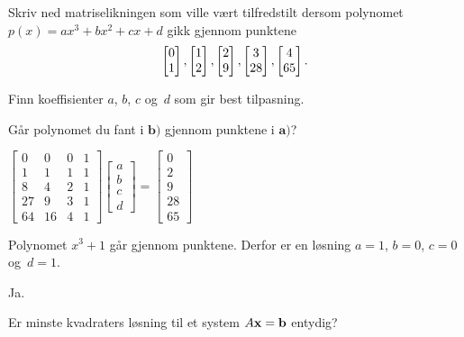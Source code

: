 \begin{oppgave}

\begin{punkt}
Skriv ned matriselikningen som ville vært tilfredstilt dersom polynomet $p(x)=ax^3+bx^2+cx+d$ gikk gjennom punktene
$$\begin{bmatrix} 0 \\ 1 \end{bmatrix}, \begin{bmatrix} 1 \\ 2 \end{bmatrix}, \begin{bmatrix} 2 \\ 9 \end{bmatrix},\begin{bmatrix} 3 \\ 28 \end{bmatrix},\begin{bmatrix} 4 \\ 65 \end{bmatrix}.$$ 
\end{punkt}


\begin{punkt}
Finn koeffisienter $a$, $b$, $c$ og~$d$ som gir best tilpasning.
\end{punkt}

\begin{punkt}
Går polynomet du fant i $\textbf{b)}$ gjennom punktene i $\textbf{a)}$?
\end{punkt}

\end{oppgave}

\begin{losning}

\begin{punkt}
$
\begin{bmatrix}
0 & 0 & 0 & 1\\
1 & 1 & 1 & 1\\
8 & 4 & 2 & 1\\
27 & 9 & 3 & 1\\
64 & 16 & 4 & 1
\end{bmatrix}\begin{bmatrix}
a\\
b\\
c\\
d
\end{bmatrix}=\begin{bmatrix}
0\\
2\\
9\\
28\\
65
\end{bmatrix}$
\end{punkt}

\begin{punkt}
Polynomet $x^3+1$ går gjennom punktene. Derfor er en løsning $a=1$, $b=0$, $c=0$ og~$d=1$.
\end{punkt}

\begin{punkt}
Ja.
\end{punkt}

\end{losning}

\begin{oppgave}
Er minste kvadraters løsning til et system $A\mathbf{x}=\mathbf{b}$ entydig?
\end{oppgave}

